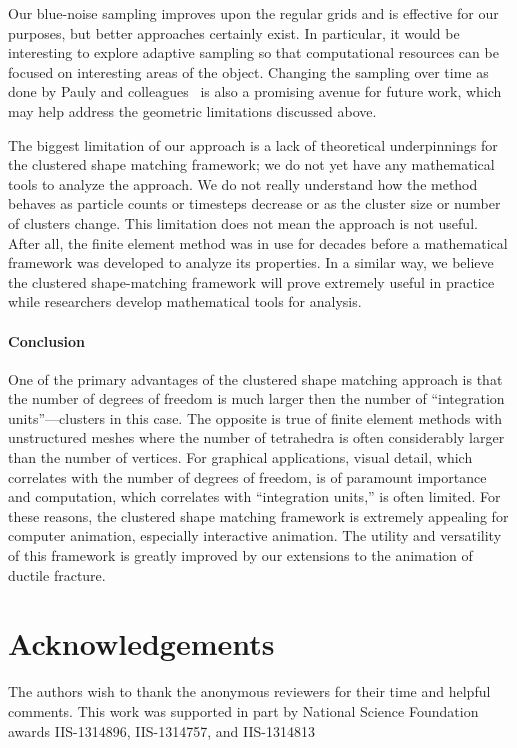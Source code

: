 \documentclass[conference]{acmsiggraph}
\begin{document}
Our blue-noise sampling improves upon the regular grids and is effective for our purposes,
but better approaches certainly exist.  In particular, it would be interesting to explore adaptive sampling
so that computational resources can be focused on interesting areas of the object.  
Changing the sampling over time as done by Pauly and colleagues~
is also a promising avenue for future work, which may help address the geometric limitations discussed above.

The biggest limitation of our approach is a lack of theoretical underpinnings for the clustered shape matching
framework; we do not yet have any mathematical tools to analyze the approach.  We do not really understand
how the method behaves as particle counts or timesteps decrease or as the cluster size or number of clusters change.
This limitation does not mean the approach is not useful.  After all, the finite element method was in use
for decades before a mathematical framework was developed to analyze its properties.  In a similar way,
we believe the clustered shape-matching framework will prove extremely useful in practice while
researchers develop mathematical tools for analysis. 

\paragraph{Conclusion} 
One of the primary advantages of the clustered shape matching approach is that the number of degrees of freedom
is much larger then the number of ``integration units''---clusters in this case.  The opposite is true of finite element
methods with unstructured meshes where the number of tetrahedra is often considerably larger than the number of vertices.  
For graphical applications, visual detail, which correlates with the number of degrees of freedom, is of paramount importance
and computation, which correlates with ``integration units,'' is often limited.  
For these reasons, the clustered shape matching framework is extremely appealing for computer animation, 
especially interactive animation.  The utility and versatility of this framework is greatly improved by our extensions 
to the animation of ductile fracture.




\section*{Acknowledgements}
The authors wish to thank the anonymous reviewers for their time and helpful comments.
This work was supported in part by National Science Foundation awards
IIS-1314896, IIS-1314757, and IIS-1314813 



\end{document}
